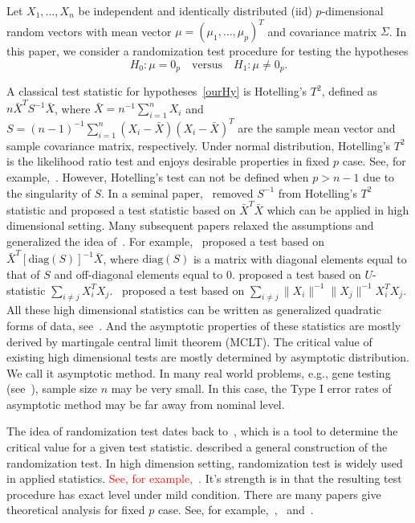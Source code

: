 \documentclass[review]{elsarticle}
\theoremstyle{plain}
\theoremstyle{definition}
\theoremstyle{remark}
\begin{document}
Let $X_{1},\ldots,X_{n}$ be independent and identically distributed (iid) $p$-dimensional random vectors with mean vector $\mu={(\mu_1,\ldots,\mu_p)}^T$ and covariance matrix $\Sigma$. In this paper, we consider a randomization test procedure for testing the hypotheses
\begin{equation}\label{ourHy}
    H_0:\mu=0_p\quad \textrm{versus} \quad H_1:\mu\neq 0_p.
\end{equation}


A classical test statistic for hypotheses~\eqref{ourHy} is Hotelling's $T^2$, defined as
    $
    n\bar{X}^T S^{-1}\bar{X}
    $,
where $\bar{X}=n^{-1}\sum_{i=1}^n X_i$ and $S=(n-1)^{-1}\sum_{i=1}^n (X_i-\bar{X}) (X_i-\bar{X})^T$ are the sample mean vector and sample covariance matrix, respectively.
Under normal distribution, Hotelling's $T^2$ is the likelihood ratio test and enjoys desirable properties in fixed $p$ case. See, for example,~\cite{andersonMultivariate}.
However, Hotelling's test can not be defined when $p>n-1$ due to the singularity of $S$. In a seminal paper,~\cite{Bai1996Efiect} removed $S^{-1}$ from Hotelling's $T^2$ statistic and proposed a test statistic based on
$
\bar{X}^T\bar{X}
$ which can be applied in high dimensional setting.
Many subsequent papers relaxed the assumptions and generalized the idea of~\cite{Bai1996Efiect}.
For example,~\cite{Srivastava2008A} proposed a test based on
$
\bar{X}^T {[\mathrm{diag}(S)]}^{-1} \bar{X}
$,
where $\mathrm{diag}(S)$ is a matrix with diagonal elements equal to that of $S$ and off-diagonal elements equal to $0$.
\cite{Chen2010A} proposed a test based on $U$-statistic
$
\sum_{i\neq j}X_i^T X_j
$.~\cite{Wang2015A} proposed a test based on  $\sum_{i\neq j}\|X_i\|^{-1}\|X_j\|^{-1}X_i^T X_j$.
All these high dimensional statistics can be written as generalized quadratic forms of data, see~\cite{Jong1987A}. And the asymptotic properties of these statistics are mostly derived by martingale central limit theorem (MCLT).
The critical value of existing high dimensional tests are mostly determined by asymptotic distribution. 
We call it asymptotic method.
 In many real world problems, e.g., gene testing (see~\cite{efron2007on}), sample size $n$ may be very small.
In this case, the Type I error rates of asymptotic method may be far away from nominal level. 


The idea of randomization test dates back to~\cite{Fisher}, which is a tool to determine the critical value for a given test statistic.
\cite{Romano1990On} described a general construction of the randomization test.
In high dimension setting, randomization test is widely used in applied statistics. \textcolor{red}{See, for example,~\cite{efron2007on}.}
It's strength is in that the resulting test procedure has exact level under mild condition.
There are many papers give theoretical analysis for fixed $p$ case.
See, for example,~\cite{Romano1990On},~\cite{Zhu2000N} and~\cite{Chung2016Multivariate}.
\end{document}
